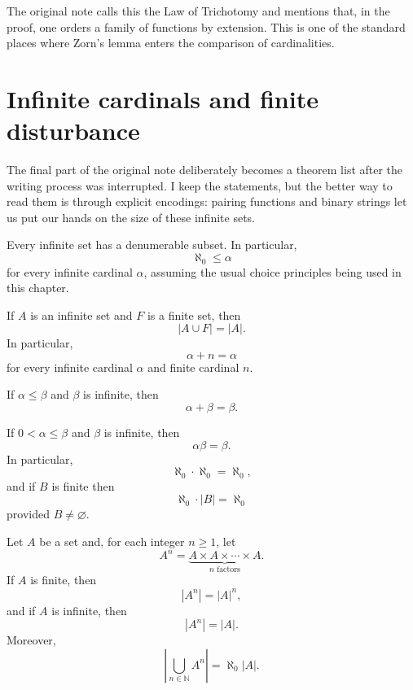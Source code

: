 \begin{remark}
The original note calls this the Law of Trichotomy and mentions that, in the proof, one orders a family of functions by extension.  This is one of the standard places where Zorn's lemma enters the comparison of cardinalities.
\end{remark}

\section{Infinite cardinals and finite disturbance}

The final part of the original note deliberately becomes a theorem list after the writing process was interrupted.  I keep the statements, but the better way to read them is through explicit encodings: pairing functions and binary strings let us put our hands on the size of these infinite sets.

\begin{theorem}
Every infinite set has a denumerable subset.  In particular,
\[
  \aleph_0\le \alpha
\]
for every infinite cardinal \(\alpha\), assuming the usual choice principles being used in this chapter.
\end{theorem}

\begin{lemma}
If \(A\) is an infinite set and \(F\) is a finite set, then
\[
  |A\cup F|=|A|.
\]
In particular,
\[
  \alpha+n=\alpha
\]
for every infinite cardinal \(\alpha\) and finite cardinal \(n\).
\end{lemma}

\begin{theorem}
If \(\alpha\le\beta\) and \(\beta\) is infinite, then
\[
  \alpha+\beta=\beta.
\]
\end{theorem}

\begin{theorem}
If \(0<\alpha\le\beta\) and \(\beta\) is infinite, then
\[
  \alpha\beta=\beta.
\]
In particular,
\[
  \aleph_0\cdot\aleph_0=\aleph_0,
\]
and if \(B\) is finite then
\[
  \aleph_0\cdot |B|=\aleph_0
\]
provided \(B\neq\varnothing\).
\end{theorem}

\begin{theorem}
Let \(A\) be a set and, for each integer \(n\ge1\), let
\[
  A^n=\underbrace{A\times A\times\cdots\times A}_{n\text{ factors}}.
\]
If \(A\) is finite, then
\[
  |A^n|=|A|^n,
\]
and if \(A\) is infinite, then
\[
  |A^n|=|A|.
\]
Moreover,
\[
  \left|\bigcup_{n\in\mathbb N}A^n\right|=\aleph_0|A|.
\]
\end{theorem}

